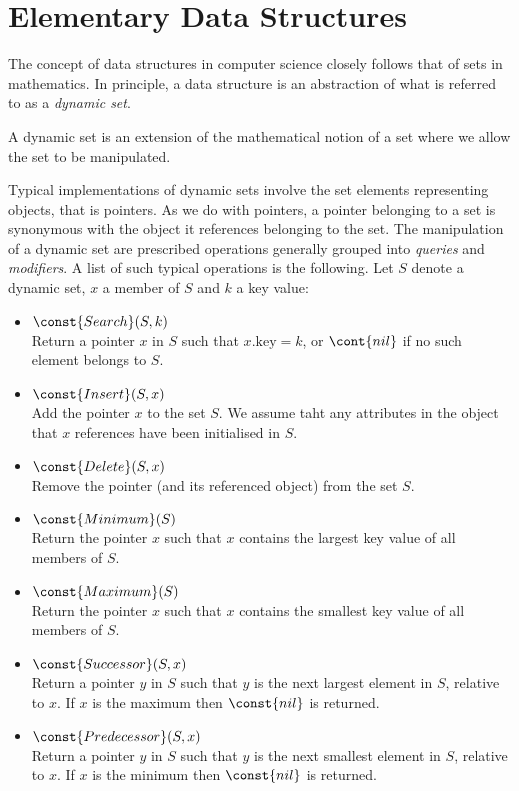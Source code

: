\section{Elementary Data Structures}
\label{sec:chapter10}

The concept of data structures in computer science closely follows that of sets in mathematics. In principle,
a data structure is an abstraction of what is referred to as a \textit{dynamic set}.
\begin{definition}
    \label{def:dynamic-set}
    A dynamic set is an extension of the mathematical notion of a set where we allow the set to be
    manipulated.
\end{definition}

Typical implementations of dynamic sets involve the set elements representing objects, that is pointers. As we
do with pointers, a pointer belonging to a set is synonymous with the object it references belonging to the
set. The manipulation of a dynamic set are prescribed operations generally grouped into \textit{queries} and
\textit{modifiers}. A list of such typical operations is the following. Let $S$ denote a dynamic set, $x$ a
member of $S$ and $k$ a key value: 
\begin{itemize}
    \item 
        $\const{Search}(S,k)$\\
        Return a pointer $x$ in $S$ such that $x.\text{key}=k$, or $\cont{nil}$ if no such element belongs to
        $S$.
    \item
        $\const{Insert}(S,x)$\\
        Add the pointer $x$ to the set $S$. We assume taht any attributes in the object that $x$ references
        have been initialised in $S$.
    \item
        $\const{Delete}(S,x)$\\
        Remove the pointer (and its referenced object) from the set $S$.
    \item
        $\const{Minimum}(S)$\\
        Return the pointer $x$ such that $x$ contains the largest key value of all members of $S$.
    \item
        $\const{Maximum}(S)$\\
        Return the pointer $x$ such that $x$ contains the smallest key value of all members of $S$.
    \item
        $\const{Successor}(S,x)$\\
        Return a pointer $y$ in $S$ such that $y$ is the next largest element in $S$, relative to $x$. If $x$
        is the maximum then $\const{nil}$ is returned.
    \item
        $\const{Predecessor}(S,x)$\\
        Return a pointer $y$ in $S$ such that $y$ is the next smallest element in $S$, relative to $x$. If $x$
        is the minimum then $\const{nil}$ is returned.
\end{itemize}
